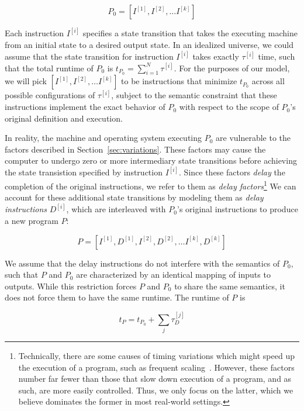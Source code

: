 \documentclass[conference]{IEEEtran}
\begin{document}
\begin{equation}
    P_0 = \left[I^{[1]}, I^{[2]}, \dots I^{[k]}\right]
\end{equation}

Each instruction $I^{[i]}$ specifies a state transition that takes the executing machine
from an initial state to a desired output state. In an idealized universe, we could assume
that the state transition for instruction $I^{[i]}$ takes exactly $\tau^{[i]}$ time, such
that the total runtime of $P_0$ is $t_{P_0} = \sum_{i=1}^N \tau^{[i]}$. For the purposes of
our model, we will pick $\left[I^{[1]}, I^{[2]}, \dots I^{[k]}\right]$ to be instructions
that minimize $t_{P_0}$ across all possible configurations of $\tau^{[i]}$, subject to the
semantic constraint that these instructions implement the exact behavior of $P_0$ with
respect to the scope of $P_0$'s original definition and execution.

In reality, the machine and operating system executing $P_0$ are vulnerable to the factors
described in Section~\ref{sec:variations}. These factors may cause the computer to undergo
zero or more intermediary state transitions before achieving the state transistion specified
by instruction $I^{[i]}$. Since these factors \textit{delay} the completion of the original
instructions, we refer to them as \textit{delay factors}\footnote{Technically, there are
some causes of timing variations which might speed up the execution of a program, such as
frequent scaling~\cite{RHEL6}. However, these factors number far fewer than those that slow
down execution of a program, and as such, are more easily controlled. Thus, we only focus on
the latter, which we believe dominates the former in most real-world settings.} We can
account for these additional state transitions by modeling them as
\textit{delay instructions} $D^{[i]}$, which are interleaved with $P_0$'s original
instructions to produce a new program $P$:

\begin{equation}
    P = \left[I^{[1]}, D^{[1]}, I^{[2]}, D^{[2]}, \dots I^{[k]}, D^{[k]}\right]
\end{equation}

We assume that the delay instructions do not interfere with the semantics of $P_0$, such
that $P$ and $P_0$ are characterized by an identical mapping of inputs to outputs. While
this restriction forces $P$ and $P_0$ to share the same semantics, it does not force them
to have the same runtime. The runtime of $P$ is

\begin{equation}
    t_P = t_{P_0} + \sum_{j} \tau^{[j]}_D
\end{equation}
\end{document}
